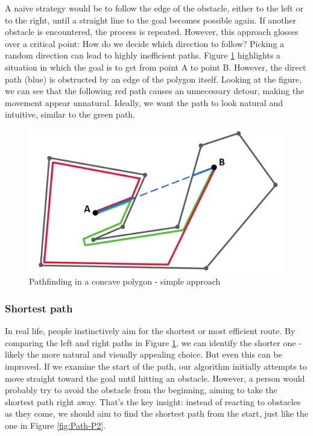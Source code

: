A naive strategy would be to follow the edge of the obstacle, either to the left or to the right, until a straight line to the goal becomes possible again. If another obstacle is encountered, the process is repeated. However, this approach glosses over a critical point: How do we decide which direction to follow? Picking a random direction can lead to highly inefficient paths. Figure \ref{fig:Path-P} highlights a situation in which the goal is to get from point A to point B. However, the direct path (blue) is obstructed by an edge of the polygon itself. Looking at the figure, we can see that the following red path causes an unnecessary detour, making the movement appear unnatural. Ideally, we want the path to look natural and intuitive, similar to the green path.

\begin{figure}[H]
\centering
\includegraphics[width=.7\linewidth]{img/polygon-prototyp.png}
\caption{Pathfinding in a concave polygon - simple approach}
\label{fig:Path-P}
\end{figure}

\subsubsection{Shortest path}
In real life, people instinctively aim for the shortest or most efficient route. By comparing the left and right paths in Figure \ref{fig:Path-P}, we can identify the shorter one - likely the more natural and visually appealing choice. But even this can be improved. If we examine the start of the path, our algorithm initially attempts to move straight toward the goal until hitting an obstacle. However, a person would probably try to avoid the obstacle from the beginning, aiming to take the shortest path right away. That’s the key insight: instead of reacting to obstacles as they come, we should aim to find the shortest path from the start, just like the one in Figure \ref{fig:Path-P2}.
 
